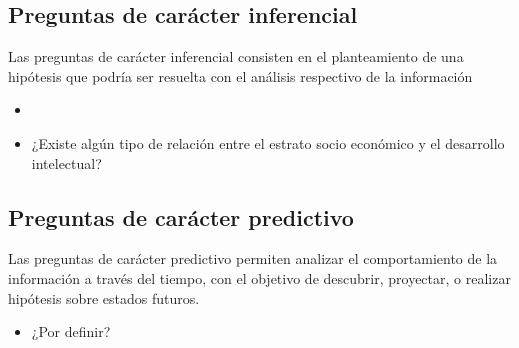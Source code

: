   \subsection{Preguntas de carácter inferencial}
   Las preguntas de carácter inferencial consisten en el planteamiento de una hipótesis que podría ser resuelta con el análisis respectivo de la información
  \begin{itemize}
   \item    \item ¿Existe algún tipo de relación entre el estrato socio económico y el desarrollo intelectual?
  \end{itemize}
  \subsection{Preguntas de carácter predictivo}
   Las preguntas de carácter predictivo permiten analizar el comportamiento de la información a través del tiempo, con el objetivo de descubrir, proyectar, o realizar hipótesis sobre estados futuros.
	\begin{itemize}
		\item ¿Por definir?
	\end{itemize}